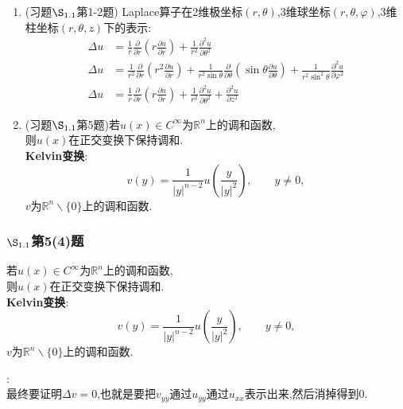 \documentclass[12pt, a4paper]{ctexart}
\begin{document}
\begin{itemize}
\begin{enumerate}
\begin{enumerate}
            \end{enumerate}
            \item (习题$\S_{1.1}$第1-2题) Laplace算子在2维极坐标$(r, \theta)$,3维球坐标$(r, \theta, \varphi)$,3维柱坐标$(r, \theta, z)$下的表示:
            \begin{align*}
            \Delta u &= \frac1r \frac{\partial}{\partial r}(r\frac{\partial u}{\partial r}) + \frac1{r^2} \frac{\partial^2 u}{\partial \theta^2}\\
            \Delta u &= \frac1{r^2} \frac\partial{\partial r}(r^2\frac{\partial u}{\partial r}) + \frac1{r^2\sin\theta}\frac\partial{\partial \theta}(\sin\theta\frac{\partial u}{\partial\theta}) + \frac1{r^2\sin^2\theta}\frac{\partial^2u}{\partial\varphi^2}\\ 
            \Delta u &= \frac1r \frac\partial{\partial r}(r\frac{\partial u}{\partial r}) + \frac1{r^2}\frac{\partial^2u}{\partial\theta^2} + \frac{\partial^2u}{\partial z^2}
            \end{align*}
            
            \item (习题$\S_{1.1}$第5题)若$u(x)\in C^\infty$为$\mathbb{R}^n$上的调和函数,\\ 则$u(x)$在正交变换下保持调和.\\ {\bf Kelvin变换}:$$v(y) = \frac1{|y|^{n-2}}u\left(\frac{y}{|y|^2}\right),\qquad y\neq0,$$ $v$为$\mathbb{R}^n \backslash\{0\}$上的调和函数.
        
        \end{enumerate}
    
    \end{itemize}

    \subsubsection{$\S_{1.1}$第5(4)题}
    \kaishu{}
    若$u(x)\in C^\infty$为$\mathbb{R}^n$上的调和函数,\\ 则$u(x)$在正交变换下保持调和.\\ {\bf Kelvin变换}:$$v(y) = \frac1{|y|^{n-2}}u\left(\frac{y}{|y|^2}\right),\qquad y\neq0,$$ $v$为$\mathbb{R}^n \backslash\{0\}$上的调和函数.
    
    \songti{}
    :\\
    最终要证明$\Delta v=0$,也就是要把$v_{yy}$通过$u_{yy}$通过$u_{xx}$表示出来,然后消掉得到0.
    
\end{document}
